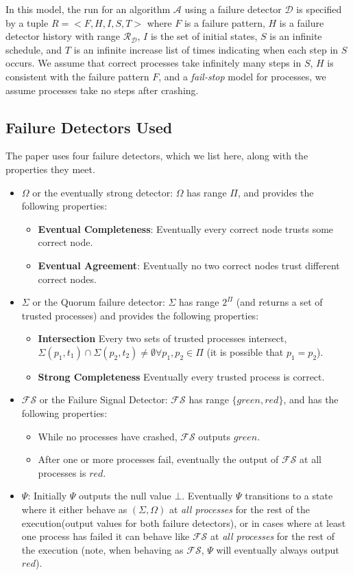 In this model, the run for an algorithm $\mathcal{A}$ using a failure detector $\mathcal{D}$ is specified by a tuple $R
= <F, H, I, S, T>$ where $F$ is a failure pattern, $H$ is a failure detector history with range
$\mathcal{R}_{\mathcal{D}}$, $I$ is the set of initial states, $S$ is an infinite schedule, and $T$ is an infinite
increase list of times indicating when each step in $S$ occurs. We assume that correct processes take infinitely many
steps in $S$, $H$ is consistent with the failure pattern $F$, and a \emph{fail-stop} model for processes, \ie we assume
processes take no steps after crashing.

\subsection{Failure Detectors Used}
The paper uses four failure detectors, which we list here, along with the properties they meet.
\begin{itemize}
\item \textbf{$\Omega$} or the eventually strong detector: $\Omega$ has range $\Pi$, and provides the
following properties:
\begin{itemize}
\item \textbf{Eventual Completeness}: Eventually every correct node trusts some correct node.
\item \textbf{Eventual Agreement}: Eventually no two correct nodes trust different correct nodes.
\end{itemize}
\item \textbf{$\Sigma$} or the Quorum failure detector: $\Sigma$ has range $2^{\Pi}$ (and returns a set of trusted
processes)  and provides the following properties:
\begin{itemize}
\item \textbf{Intersection} Every two sets of trusted processes intersect, \ie $\Sigma(p_1, t_1) \cap \Sigma(p_2, t_2)
\neq \emptyset \forall p_1, p_2 \in \Pi$ (it is possible that $p_1 = p_2$).
\item \textbf{Strong Completeness} Eventually every trusted process is correct.
\end{itemize}
\item \textbf{$\mathcal{FS}$} or the Failure Signal Detector: $\mathcal{FS}$ has range $\{green, red\}$, and has the
following properties:
\begin{itemize}
\item While no processes have crashed, $\mathcal{FS}$ outputs $green$.
\item After one or more processes fail, eventually the output of $\mathcal{FS}$ at all processes is $red$.
\end{itemize}
\item \textbf{$\Psi$}: Initially $\Psi$ outputs the null value $\bot$. Eventually $\Psi$ transitions to a state where it
either behave as $(\Sigma, \Omega)$ at \emph{all processes} for the rest of the execution(\ie output values for both failure detectors),
or in cases where at least one process has failed it can behave like $\mathcal{FS}$ at \emph{all processes} for the rest
of the execution (note, when behaving as $\mathcal{FS}$, $\Psi$ will eventually always output $red$).
\end{itemize}

